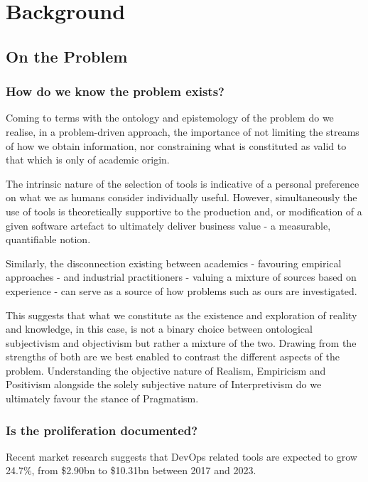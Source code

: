 \chapter{Background}

\section{On the Problem}

\subsection{How do we know the problem exists?}

Coming to terms with the ontology and epistemology of the problem do we realise, in a problem-driven approach, the importance of not limiting the streams of how we obtain information, nor constraining what is constituted as valid to that which is only of academic origin.

The intrinsic nature of the selection of tools is indicative of a personal preference on what we as humans consider individually useful. However, simultaneously the use of tools is theoretically supportive to the production and, or modification of a given software artefact to ultimately deliver business value - a measurable, quantifiable notion.

Similarly, the disconnection existing between academics - favouring empirical approaches - and industrial practitioners - valuing a mixture of sources based on experience - can serve as a source of how problems such as ours are investigated.

This suggests that what we constitute as the existence and exploration of reality and knowledge, in this case, is not a binary choice between ontological subjectivism and objectivism but rather a mixture of the two. Drawing from the strengths of both are we best enabled to contrast the different aspects of the problem. Understanding the objective nature of Realism, Empiricism and Positivism alongside the solely subjective nature of Interpretivism do we ultimately favour the stance of Pragmatism.

\subsection{Is the proliferation documented?}


Recent market research suggests that DevOps related tools are expected to grow 24.7\%, from \$2.90bn to \$10.31bn between 2017 and 2023.

